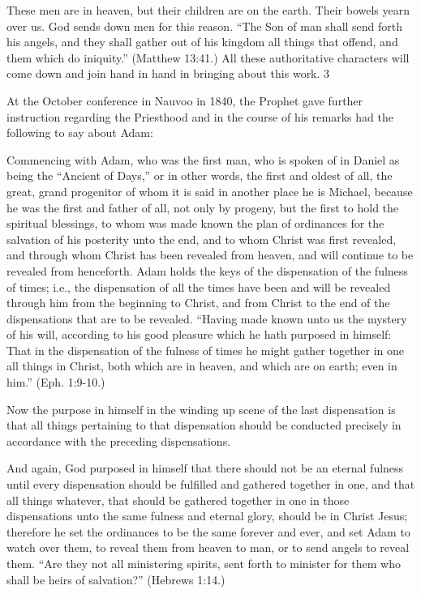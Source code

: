These men are in heaven, but their children are on the earth. Their bowels yearn over us. God
sends down men for this reason. ``The Son of man shall send forth his angels, and they shall
gather out of his kingdom all things that offend, and them which do iniquity.'' (Matthew
13:41.) All these authoritative characters will come down and join hand in hand in bringing
about this work. 3

At the October conference in Nauvoo in 1840, the Prophet gave further instruction regarding
the Priesthood and in the course of his remarks had the following to say about Adam:

Commencing with Adam, who was the first man, who is spoken of in Daniel as being the
``Ancient of Days,'' or in other words, the first and oldest of all, the great, grand progenitor of
whom it is said in another place he is Michael, because he was the first and father of all, not
only by progeny, but the first to hold the spiritual blessings, to whom was made known the
plan of ordinances for the salvation of his posterity unto the end, and to whom Christ was
first revealed, and through whom Christ has been revealed from heaven, and will continue to
be revealed from henceforth. Adam holds the keys of the dispensation of the fulness of times;
i.e., the dispensation of all the times have been and will be revealed through him from the
beginning to Christ, and from Christ to the end of the dispensations that are to be revealed.
``Having made known unto us the mystery of his will, according to his good pleasure which
he hath purposed in himself: That in the dispensation of the fulness of times he might gather
together in one all things in Christ, both which are in heaven, and which are on earth; even in
him.'' (Eph. 1:9-10.)

Now the purpose in himself in the winding up scene of the last dispensation is that all things
pertaining to that dispensation should be conducted precisely in accordance with the
preceding dispensations.

And again, God purposed in himself that there should not be an eternal fulness until every
dispensation should be fulfilled and gathered together in one, and that all things whatever,
that should be gathered together in one in those dispensations unto the same fulness and
eternal glory, should be in Christ Jesus; therefore he set the ordinances to be the same forever
and ever, and set Adam to watch over them, to reveal them from heaven to man, or to send
angels to reveal them. ``Are they not all ministering spirits, sent forth to minister for them
who shall be heirs of salvation?'' (Hebrews 1:14.)

